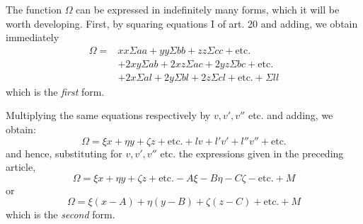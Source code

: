 The function \(\Omega\) can be expressed in indefinitely many forms, which it will be worth developing. First, by squaring equations I of art. 20 and adding, we obtain immediately
\[
\begin{aligned}
\Omega={}&xx\Sigma aa+yy\Sigma bb+zz\Sigma cc+\text{etc.}\\
&+2xy\Sigma ab+2xz\Sigma ac+2yz\Sigma bc+\text{etc.}\\
&+2x\Sigma al+2y\Sigma bl+2z\Sigma cl+\text{etc.}+\Sigma ll
\end{aligned}
\]
which is the \textit{first} form.

Multiplying the same equations respectively by \(v,v',v''\) etc. and adding, we obtain:
\[
\Omega=\xi x+\eta y+\zeta z+\text{etc.}+lv+l'v'+l''v''+\text{etc.}
\]
and hence, substituting for \(v,v',v''\) etc. the expressions given in the preceding article,
\[
\Omega=\xi x+\eta y+\zeta z+\text{etc.}-A\xi-B\eta-C\zeta-\text{etc.}+M
\]
or
\[
\Omega=\xi(x-A)+\eta(y-B)+\zeta(z-C)+\text{etc.}+M
\]
which is the \textit{second} form.


